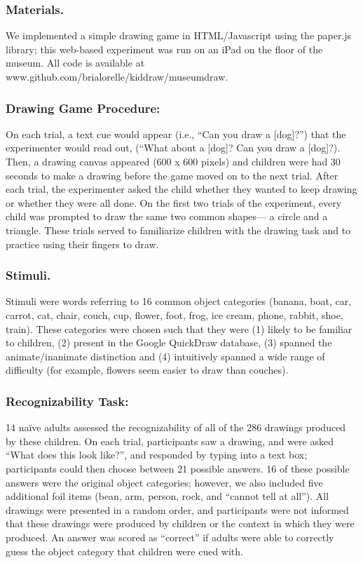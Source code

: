 \documentclass[10pt, letterpaper]{article}
\begin{document}
\subsubsection{Materials.}\label{materials.}

We implemented a simple drawing game in HTML/Javascript using the
paper.js library; this web-based experiment was run on an iPad on the
floor of the museum. All code is available at
www.github.com/brialorelle/kiddraw/museumdraw.

\subsubsection{Drawing Game Procedure:}\label{drawing-game-procedure}

On each trial, a text cue would appear (i.e., ``Can you draw a
{[}dog{]}?'') that the experimenter would read out, (``What about a
{[}dog{]}? Can you draw a {[}dog{]}?). Then, a drawing canvas appeared
(600 x 600 pixels) and children were had 30 seconds to make a drawing
before the game moved on to the next trial. After each trial, the
experimenter asked the child whether they wanted to keep drawing or
whether they were all done. On the first two trials of the experiment,
every child was prompted to draw the same two common shapes--- a circle
and a triangle. These trials served to familiarize children with the
drawing task and to practice using their fingers to draw.

\subsubsection{Stimuli.}\label{stimuli.}

Stimuli were words referring to 16 common object categories (banana,
boat, car, carrot, cat, chair, couch, cup, flower, foot, frog, ice
cream, phone, rabbit, shoe, train). These categories were chosen such
that they were (1) likely to be familiar to children, (2) present in the
Google QuickDraw database, (3) spanned the animate/inanimate distinction
and (4) intuitively spanned a wide range of difficulty (for example,
flowers seem easier to draw than couches).

\subsubsection{Recognizability Task:}\label{recognizability-task}

14 naïve adults assessed the recognizability of all of the 286 drawings
produced by these children. On each trial, participants saw a drawing,
and were asked ``What does this look like?'', and responded by typing
into a text box; participants could then choose between 21 possible
answers. 16 of these possible answers were the original object
categories; however, we also included five additional foil items (bean,
arm, person, rock, and ``cannot tell at all''). All drawings were
presented in a random order, and participants were not informed that
these drawings were produced by children or the context in which they
were produced. An answer was scored as ``correct'' if adults were able
to correctly guess the object category that children were cued with.
\end{document}
